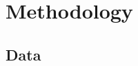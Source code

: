 \documentclass[12pt,a4paper,oneside]{article}
\begin{document}



\newpage
\section{Methodology}\label{sec:methodology}

%
%
%


\subsection{Data}\label{subsec:data}
\end{document}

